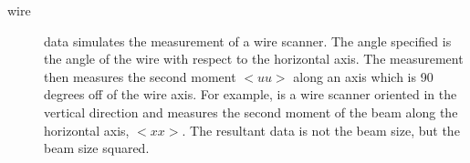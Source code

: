 \begin{description}
  \item[wire] \Newline
{} data simulates the measurement of a wire scanner. The angle specified
is the angle of the wire with respect to the horizontal axis. The measurement
then measures the second moment $<uu>$ along an axis which is 90 degrees off of
the wire axis. For example,  is a wire scanner oriented in the
vertical direction and measures the second moment of the beam along the
horizontal axis, $<xx>$. The resultant data is not the beam size, but the beam
size squared.

  \end{description}



